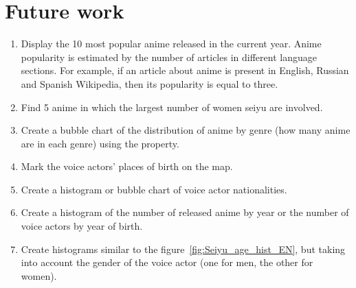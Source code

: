 \section{Future work}

\begin{enumerate}
	\item Display the 10 most popular anime released in the current year. Anime popularity is estimated by the number of articles in different language sections. For example, if an article about anime is present in English, Russian and Spanish Wikipedia, then its popularity is equal to three.
	\item Find 5 anime in which the largest number of women seiyu are involved.
	\item Create a bubble chart of the distribution of anime by genre (how many anime are in each genre) using the  property.
	\item Mark the voice actors' places of birth on the map.
	\item Create a histogram or bubble chart of voice actor nationalities.
	\item Create a histogram of the number of released anime by year or the number of voice actors by year of birth.
	\item Create histograms similar to the figure~\ref{fig:Seiyu_age_hist_EN}, but taking into account the gender of the voice actor (one for men, the other for women).
\end{enumerate}